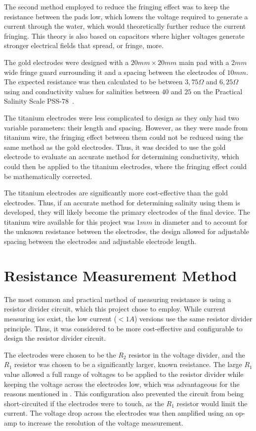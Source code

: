 The second method employed to reduce the fringing effect was to keep the resistance between the pads low, which lowers the voltage required to generate a current through the water, which would theoretically further reduce the current fringing.
This theory is also based on capacitors where higher voltages generate stronger electrical fields that spread, or fringe, more.

The gold electrodes were designed with a $20mm \times 20mm$ main pad with a $2mm$ wide fringe guard surrounding it and a spacing between the electrodes of $10mm$.
The expected resistance was then calculated to be between $3,75\Omega$ and $6,25\Omega$ using  and conductivity values for salinities between $40$ and $25$ on the Practical Salinity Scale PSS-78~\cite{ioc_teos_2010}.

The titanium electrodes were less complicated to design as they only had two variable parameters: their length and spacing.
However, as they were made from titanium wire, the fringing effect between them could not be reduced using the same method as the gold electrodes.
Thus, it was decided to use the gold electrode to evaluate an accurate method for determining conductivity, which could then be applied to the titanium electrodes, where the fringing effect could be mathematically corrected.

The titanium electrodes are significantly more cost-effective than the gold electrodes. 
Thus, if an accurate method for determining salinity using them is developed, they will likely become the primary electrodes of the final device.  
The titanium wire available for this project was $1mm$ in diameter and to account for the unknown resistance between the electrodes, the design allowed for adjustable spacing between the electrodes and adjustable electrode length.

\section{Resistance Measurement Method}

The most common and practical method of measuring resistance is using a resistor divider circuit, which this project chose to employ. 
While current measuring \glspl{ic} exist, the low current ($<1A$) versions use the same resistor divider principle. 
Thus, it was considered to be more cost-effective and configurable to design the resistor divider circuit.

The electrodes were chosen to be the $R_2$ resistor in the voltage divider, and the $R_1$ resistor was chosen to be a significantly larger, known resistance.
The large $R_1$ value allowed a full range of voltages to be applied to the resistor divider while keeping the voltage across the electrodes low, which was advantageous for the reasons mentioned in .
This configuration also prevented the circuit from being short-circuited if the electrodes were to touch, as the $R_1$ resistor would limit the current.
The voltage drop across the electrodes was then amplified using an op-amp to increase the resolution of the voltage measurement.

